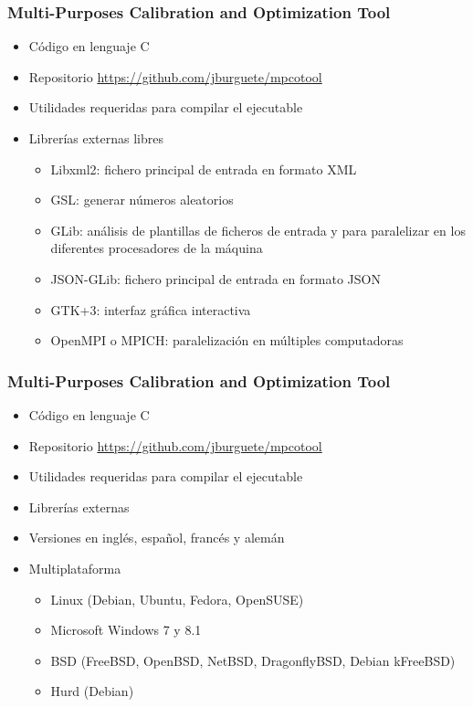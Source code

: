 \documentclass{beamer}
\begin{document}
\begin{frame}
	\frametitle{Multi-Purposes Calibration and Optimization Tool}
	\begin{itemize}
		\item Código en lenguaje C
		\item Repositorio \url{https://github.com/jburguete/mpcotool}
		\item Utilidades requeridas para compilar el ejecutable
		\item Librerías externas libres
		\begin{itemize}
			\item Libxml2: fichero principal de entrada en formato XML
			\item GSL: generar números aleatorios
			\item GLib: análisis de plantillas de ficheros de entrada y para paralelizar en los diferentes procesadores de la máquina
			\item JSON-GLib: fichero principal de entrada en formato JSON
			\item GTK+3: interfaz gráfica interactiva
			\item OpenMPI o MPICH: paralelización en múltiples computadoras
		\end{itemize}
	\end{itemize}
\end{frame}

\begin{frame}
	\frametitle{Multi-Purposes Calibration and Optimization Tool}
	\begin{itemize}
		\item Código en lenguaje C
		\item Repositorio \url{https://github.com/jburguete/mpcotool}
		\item Utilidades requeridas para compilar el ejecutable
		\item Librerías externas
		\item Versiones en inglés, español, francés y alemán
		\item Multiplataforma
		\begin{itemize}
			\item Linux (Debian, Ubuntu, Fedora, OpenSUSE)
			\item Microsoft Windows 7 y 8.1
			\item BSD (FreeBSD, OpenBSD, NetBSD, DragonflyBSD, Debian kFreeBSD)
			\item Hurd (Debian)
		\end{itemize}
	\end{itemize}
\end{frame}
\end{document}
